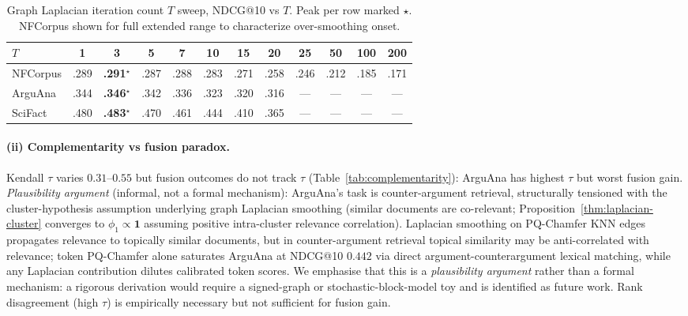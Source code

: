 \documentclass[review,1p]{elsarticle}
\begin{document}
\begin{table}[h]
\centering
\small
\caption{Graph Laplacian iteration count $T$ sweep, NDCG@10 vs $T$. Peak per row marked $\star$. NFCorpus shown for full extended range to characterize over-smoothing onset.}
\label{tab:T-sweep}
\begin{tabular}{lccccccccccc}
\toprule
$T$ & 1 & 3 & 5 & 7 & 10 & 15 & 20 & 25 & 50 & 100 & 200 \\
\midrule
NFCorpus & .289 & \textbf{.291}$^\star$ & .287 & .288 & .283 & .271 & .258 & .246 & .212 & .185 & .171 \\
ArguAna & .344 & \textbf{.346}$^\star$ & .342 & .336 & .323 & .320 & .316 & --- & --- & --- & --- \\
SciFact & .480 & \textbf{.483}$^\star$ & .470 & .461 & .444 & .410 & .365 & --- & --- & --- & --- \\
\bottomrule
\end{tabular}
\end{table}


\paragraph{(ii) Complementarity vs fusion paradox.} Kendall $\tau$ varies $0.31$--$0.55$ but fusion outcomes do not track $\tau$ (Table~\ref{tab:complementarity}): ArguAna has highest $\tau$ but worst fusion gain. \emph{Plausibility argument} (informal, not a formal mechanism): ArguAna's task is counter-argument retrieval, structurally tensioned with the cluster-hypothesis assumption underlying graph Laplacian smoothing (similar documents are co-relevant; Proposition~\ref{thm:laplacian-cluster} converges to $\phi_1 \propto \mathbf{1}$ assuming positive intra-cluster relevance correlation). Laplacian smoothing on PQ-Chamfer KNN edges propagates relevance to topically similar documents, but in counter-argument retrieval topical similarity may be anti-correlated with relevance; token PQ-Chamfer alone saturates ArguAna at NDCG@10 $0.442$ via direct argument-counterargument lexical matching, while any Laplacian contribution dilutes calibrated token scores. We emphasise that this is a \emph{plausibility argument} rather than a formal mechanism: a rigorous derivation would require a signed-graph or stochastic-block-model toy and is identified as future work. Rank disagreement (high $\tau$) is empirically necessary but not sufficient for fusion gain.
\end{document}
